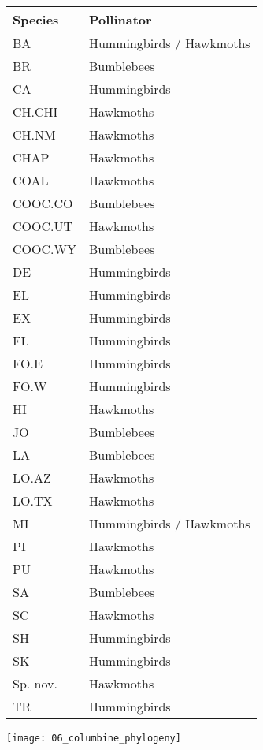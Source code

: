 \documentclass[12pt, hidelinks]{exam}
\begin{document}
\begin{tabular}[c]{@{}ll@{}}
\toprule
Species & Pollinator\tabularnewline
\midrule
BA 				& Hummingbirds / Hawkmoths\tabularnewline
BR 				& Bumblebees\tabularnewline
CA 				& Hummingbirds\tabularnewline
CH.CHI 		& Hawkmoths\tabularnewline
CH.NM 		& Hawkmoths\tabularnewline
CHAP 			& Hawkmoths\tabularnewline
COAL 			& Hawkmoths\tabularnewline
COOC.CO	& Bumblebees\tabularnewline
COOC.UT 	& Hawkmoths\tabularnewline
COOC.WY 	& Bumblebees\tabularnewline
DE 				& Hummingbirds\tabularnewline
EL 				& Hummingbirds\tabularnewline
EX 				& Hummingbirds\tabularnewline
FL 				& Hummingbirds\tabularnewline
FO.E 			& Hummingbirds\tabularnewline
FO.W 			& Hummingbirds\tabularnewline
HI 				& Hawkmoths\tabularnewline
JO 				& Bumblebees\tabularnewline
LA 				& Bumblebees\tabularnewline
LO.AZ 			& Hawkmoths\tabularnewline
LO.TX 			& Hawkmoths\tabularnewline
MI 				& Hummingbirds / Hawkmoths\tabularnewline
PI 				& Hawkmoths\tabularnewline
PU 				& Hawkmoths\tabularnewline
SA 				& Bumblebees\tabularnewline
SC 				& Hawkmoths\tabularnewline
SH 				& Hummingbirds\tabularnewline
SK 				& Hummingbirds\tabularnewline
Sp. nov.		& Hawkmoths\tabularnewline
TR 				& Hummingbirds\tabularnewline
\bottomrule
\end{tabular}

\newpage

	\texttt{[image: 06\_columbine\_phylogeny]}
\end{document}
